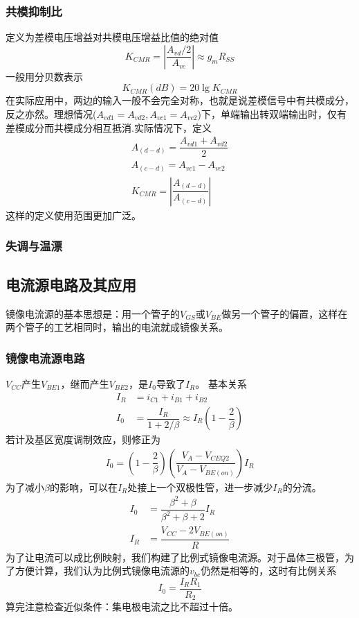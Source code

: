 \documentclass{ctexart}
\begin{document}
\subsubsection{共模抑制比}
定义为差模电压增益对共模电压增益比值的绝对值
\begin{equation}
    K_{CMR}=\left |\dfrac{A_{vd}/2}{A_{vc}}\right |\approx g_mR_{SS}
\end{equation}
一般用分贝数表示
\begin{equation}
    K_{CMR}(dB)=20\lg K_{CMR}
\end{equation}
在实际应用中，两边的输入一般不会完全对称，也就是说差模信号中有共模成分，反之亦然。理想情况($A_{vd1}=A_{vd2},A_{vc1}=A_{vc2}$)下，单端输出转双端输出时，仅有差模成分而共模成分相互抵消.实际情况下，定义
\begin{align}
    A_{(d-d)}=\dfrac{A_{vd1}+A_{vd2}}{2}\\
    A_{(c-d)}=A_{vc1}-A_{vc2}\\
    K_{CMR}=\left |\dfrac{A_{(d-d)}}{A_{(c-d)}}\right |
\end{align}
这样的定义使用范围更加广泛。
\subsubsection{失调与温漂}
\subsection{电流源电路及其应用}
镜像电流源的基本思想是：用一个管子的$V_{GS}$或$V_{BE}$做另一个管子的偏置，这样在两个管子的工艺相同时，输出的电流就成镜像关系。
\subsubsection{镜像电流源电路}
$V_{CC}$产生$V_{BE1}$，继而产生$V_{BE2}$，是$I_0$导致了$I_R$。
基本关系
\begin{align}
    I_R&=i_{C1}+i_{B1}+i_{B2}\\
    I_0&=\dfrac{I_R}{1+2/\beta}\approx I_R(1-\dfrac{2}{\beta})
\end{align}
若计及基区宽度调制效应，则修正为
\begin{align}
    I_0=(1-\dfrac{2}{\beta})(\dfrac{V_A-V_{CEQ2}}{V_A-V_{BE(on)}})I_R
\end{align}
为了减小$\beta$的影响，可以在$I_R$处接上一个双极性管，进一步减少$I_R$的分流。
\begin{align}
    I_0&=\dfrac{\beta^2+\beta}{\beta^2+\beta+2}I_R\\
    I_R&=\dfrac{V_{CC}-2V_{BE(on)}}{R}
\end{align}
为了让电流可以成比例映射，我们构建了比例式镜像电流源。对于晶体三极管，为了方便计算，我们认为比例式镜像电流源的$v_{be}$仍然是相等的，这时有比例关系
\begin{equation}
    I_0=\dfrac{I_RR_1}{R_2}
\end{equation}
算完注意检查近似条件：集电极电流之比不超过十倍。
\end{document}
